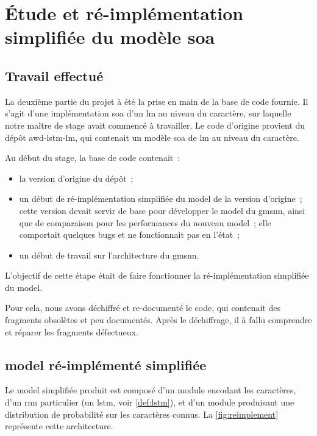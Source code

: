 \section{Étude et ré-implémentation simplifiée du modèle \gls{soa}}
\subsection{Travail effectué}\label{subsec:codebase}
La deuxième partie du projet à été la prise en main de la base de code fournie.
Il s'agit d'une implémentation \gls{soa} d'un \gls{lm} au niveau du caractère, sur laquelle notre maître de stage avait commencé à travailler.
Le code d'origine provient du dépôt \og awd-lstm-lm\fg{}\autocite{awd_source}, qui contenait un modèle \gls{soa} de \gls{lm} au niveau du caractère.

Au début du stage, la base de code contenait~:
\begin{itemize}
	\item la version d'origine du dépôt~;
	\item un début de ré-implémentation simplifiée du \gls{model} de la version d'origine~; cette version  devait servir de base pour développer le \gls{model} du \gls{gmsnn}, ainsi que de comparaison pour les performances du nouveau \gls{model}~; elle comportait quelques \glspl{bug} et ne fonctionnait pas en l'état~;
	\item un début de travail sur l'architecture du \gls{gmsnn}.
\end{itemize}

\vspace{1em}
L'objectif de cette étape était de faire fonctionner la ré-implémentation simplifiée du \gls{model}.

Pour cela, nous avons déchiffré et re-documenté le code, qui contenait des fragments obsolètes et peu documentés.
Après le déchiffrage, il à fallu comprendre et réparer les fragments défectueux.

\subsection[\Glsentrytext{model} ré-implémenté simplifiée]{\Gls{model} ré-implémenté simplifiée}
Le \gls{model} simplifiée produit est composé d'un module encodant les caractères, d'un \gls{rnn} particulier (un \gls{lstm}, voir \autoref{def:lstm}), et d'un module produisant une distribution de probabilité sur les caractères connus. La \autoref{fig:reimplement} représente cette architecture.


